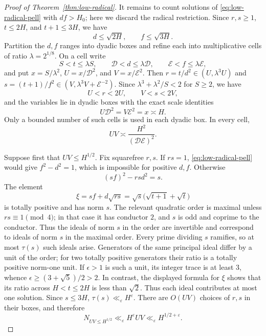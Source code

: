 \begin{proof}[Proof of Theorem~\ref{thm:low-radical}]
It remains to count solutions of \eqref{eq:low-radical-pell} with
$df>H_0$; here we discard the radical restriction. Since $r,s\ge1$,
$t\le2H$, and $t+1\le3H$, we have
\begin{equation}\label{eq:low-radical-squareparts}
d\le\sqrt{2H},\qquad f\le\sqrt{3H}.
\end{equation}
Partition the $d,f$ ranges into dyadic boxes and refine each into
multiplicative cells of ratio $\lambda=2^{1/8}$. On a cell write
\[
 S<t\le\lambda S,\qquad \mathcal D<d\le\lambda \mathcal D,\qquad
\mathcal E<f\le\lambda \mathcal E,
\]
and put $x=S/\lambda^2$, $U=x/\mathcal D^2$, and $V=x/\mathcal E^2$. Then
$r=t/d^2\in(U,\lambda^3U)$ and
$s=(t+1)/f^2\in(V,\lambda^3V+\mathcal E^{-2})$. Since
$\lambda^3+\lambda^2/S<2$ for $S\ge2$, we have
\[
U<r<2U,\qquad V<s<2V,
\]
and the variables lie in dyadic boxes with the exact scale identities
\[
U\mathcal D^2=V\mathcal E^2=x\asymp H.
\]
Only a bounded number of such cells is used in each dyadic box. In every
cell,
\begin{equation}\label{eq:low-radical-box-products}
UV\asymp\frac{H^2}{(\mathcal D\mathcal E)^2}.
\end{equation}

Suppose first that $UV\le H^{1/2}$. Fix squarefree $r,s$. If $rs=1$,
\eqref{eq:low-radical-pell} would give $f^2-d^2=1$, which is impossible
for positive $d,f$. Otherwise
\[
(sf)^2-rsd^2=s.
\]
The element
\[
\xi=sf+d\sqrt{rs}
      =\sqrt s\bigl(\sqrt{t+1}+\sqrt t\bigr)
\]
is totally positive and has norm $s$. The relevant quadratic order is
maximal unless $rs\equiv1\pmod4$; in that case it has conductor $2$,
and $s$ is odd and coprime to the conductor. Thus the ideals of norm $s$
in the order are invertible and correspond to ideals of norm $s$ in the
maximal order. Every prime dividing $s$ ramifies, so at most $\tau(s)$ such
ideals arise. Generators of the same principal ideal differ by a unit of
the order; for two totally positive generators their ratio is a totally
positive norm-one unit. If
$\epsilon>1$ is such a unit, its integer trace is at least $3$, whence
$\epsilon\ge(3+\sqrt5)/2>2$. In contrast, the displayed formula for
$\xi$ shows that its ratio across $H<t\le2H$ is less than $\sqrt2$.
Thus each ideal contributes at most one solution. Since $s\le3H$,
$\tau(s)\ll_\varepsilon H^\varepsilon$. There are $O(UV)$ choices of
$r,s$ in their boxes, and therefore
\begin{equation}\label{eq:low-radical-pell-range}
N_{UV\le H^{1/2}}\ll_\varepsilon H^\varepsilon UV
                       \ll_\varepsilon H^{1/2+\varepsilon}.
\end{equation}


\end{proof}
